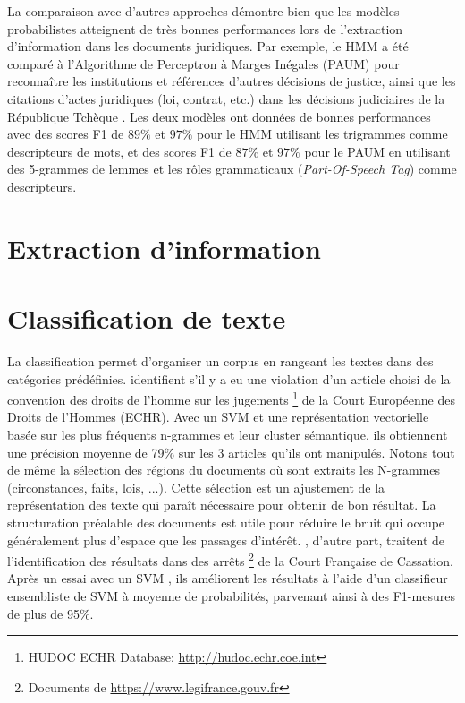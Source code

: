La comparaison avec d'autres approches démontre bien que les modèles probabilistes atteignent de très bonnes performances lors de l'extraction d'information dans les documents juridiques. Par exemple, le HMM a été comparé à l'Algorithme de Perceptron à Marges Inégales (PAUM) \citep{li2002PAUM} pour reconnaître les institutions et références d'autres décisions de justice, ainsi que les citations d'actes juridiques (loi, contrat, etc.) dans les décisions judiciaires de la République Tchèque \citep{Kriz2014nerinczechdecisions}. Les deux modèles ont données de bonnes performances avec des scores F1 de $ 89 \% $ et $ 97 \% $ pour le HMM utilisant les trigrammes comme descripteurs de mots, et des scores F1 de $ 87 \% $ et $ 97 \% $ pour le PAUM en utilisant des 5-grammes de lemmes et les rôles grammaticaux (\textit{Part-Of-Speech Tag}) comme descripteurs. 

\section{Extraction d'information}

\section{Classification de texte}
La classification permet d'organiser un corpus en rangeant les textes dans des catégories prédéfinies.  \cite{Aletras2016predictDecisionECHR} identifient s'il y a eu une violation d'un article choisi de la convention des droits de l'homme sur les jugements \footnote{HUDOC ECHR Database: \url{http://hudoc.echr.coe.int}} de la Court Européenne des Droits de l'Hommes (ECHR). Avec un SVM et une représentation vectorielle basée sur les plus fréquents n-grammes et leur cluster sémantique, ils obtiennent une précision moyenne de 79\% sur les 3 articles qu'ils ont manipulés. Notons tout de même la sélection des régions du documents où sont extraits les N-grammes (circonstances, faits, lois, ...). Cette sélection est un ajustement de la représentation des texte qui paraît nécessaire pour obtenir de bon résultat. La structuration préalable des documents est utile pour réduire le bruit qui occupe généralement plus d'espace que les passages d'intérêt. \cite{sulea2017legalEnsSVM}, d'autre part, traitent de l'identification des résultats dans des arrêts \footnote{Documents de \url{https://www.legifrance.gouv.fr}} de la Court Française de Cassation. Après un essai avec un SVM \citep{Sulea2017predictareadecision}, ils améliorent les résultats à l'aide d'un classifieur ensembliste de SVM à moyenne de probabilités, parvenant ainsi à des F1-mesures de plus de 95\%. 


